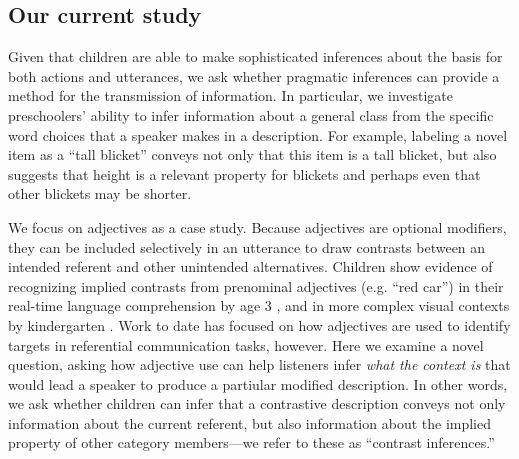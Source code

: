 \documentclass[man]{apa2}
\begin{document}

\subsection{Our current study}

Given that children are able to make sophisticated inferences about the basis for both actions and utterances, we ask whether pragmatic inferences can provide a method for the transmission of information. In particular, we investigate preschoolers' ability to infer information about a general class from the specific word choices that a speaker makes in a description. For example, labeling a novel item as a ``tall blicket'' conveys not only that this item is a tall blicket, but also suggests that height is a relevant property for blickets and perhaps even that other blickets may be shorter. 

We focus on adjectives as a case study.  Because adjectives are optional modifiers, they can be included selectively in an utterance to draw contrasts between an intended referent and other unintended alternatives. 
Children show evidence of recognizing implied contrasts from prenominal adjectives (e.g. ``red car'') in their real-time language comprehension by age 3 \cite{fernald2010}, and in more complex visual contexts by kindergarten \cite{nadig2002}. Work to date has focused on how adjectives are used to identify targets in referential communication tasks, however.  Here we examine a novel question, asking how adjective use can help listeners infer \emph{what the context is} that would lead a speaker to produce a partiular modified description. In other words, we ask whether children can infer that a contrastive description conveys not only information about the current referent, but also information about the implied property of other category members---we refer to these as ``contrast inferences.'' 
\end{document}
